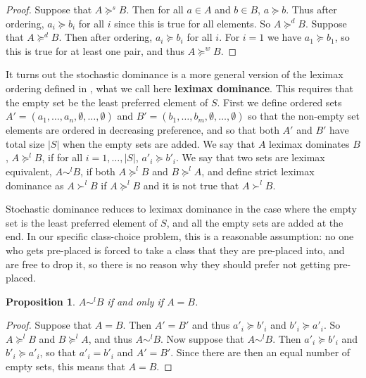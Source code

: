 \documentclass[12pt,letterpaper]{extarticle}
\newtheorem{prop}{Proposition}
\begin{document}
\begin{proof}
Suppose that $A \succcurlyeq^s B$. Then for all $a \in A$ and $b \in B$, $a \succcurlyeq b$. Thus after ordering, $a_i \succcurlyeq b_i$ for all $i$ since this is true for all elements. So $A \succcurlyeq^d B$. Suppose that $A \succcurlyeq^d B$. Then after ordering, $a_i \succcurlyeq b_i$ for all $i$. For $i=1$ we have $a_1 \succcurlyeq b_1$, so this is true for at least one pair, and thus $A \succcurlyeq^w B$.
\end{proof}

It turns out the stochastic dominance is a more general version of the leximax ordering defined in \cite{bossert}, what we call here \textbf{leximax dominance}. This requires that the empty set be the least preferred element of $S$. First we define ordered sets $A' = (a_1,\ldots,a_n,\emptyset,\ldots,\emptyset)$ and $B' = (b_1,\ldots,b_m,\emptyset,\ldots,\emptyset)$ so that the non-empty set elements are ordered in decreasing preference, and so that both $A'$ and $B'$ have total size $|S|$ when the empty sets are added. We say that $A$ leximax dominates $B$, $A \succcurlyeq^l B$, if for all $i = 1,\ldots,|S|$, $a'_i \succcurlyeq b'_i$. We say that two sets are leximax equivalent, $A \sim^l B$, if both $A \succcurlyeq^l B$ and $B \succcurlyeq^l A$, and define strict leximax dominance as $A \succ^l B$ if $A \succcurlyeq^l B$ and it is not true that $A \succ^l B$.

Stochastic dominance reduces to leximax dominance in the case where the empty set is the least preferred element of $S$, and all the empty sets are added at the end. In our specific class-choice problem, this is a reasonable assumption: no one who gets pre-placed is forced to take a class that they are pre-placed into, and are free to drop it, so there is no reason why they should prefer not getting pre-placed.

\begin{prop}
$A \sim^l B$ if and only if $A = B$.
\end{prop}

\begin{proof}
Suppose that $A = B$. Then $A' = B'$ and thus $a'_i \succcurlyeq b'_i$ and $b'_i \succcurlyeq a'_i$. So $A \succcurlyeq^l B$ and $B \succcurlyeq^l A$, and thus $A \sim^l B$. Now suppose that $A \sim^l B$. Then $a'_i \succcurlyeq b'_i$ and $b'_i \succcurlyeq a'_i$, so that $a'_i = b'_i$ and $A' = B'$. Since there are then an equal number of empty sets, this means that $A = B$.
\end{proof}
\end{document}
